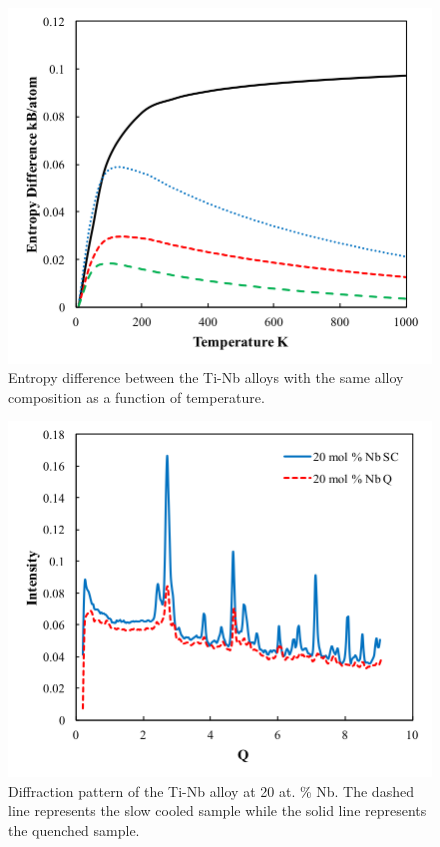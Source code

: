 \pagebreak
\begin{figure}[H]
	\centering
	\includegraphics[width=\textwidth]{Chapter-7/Figures/ediff.png}
	\caption{Entropy difference between the Ti-Nb alloys with the same alloy composition as a function of temperature.}
	\label{Ch7-figure:ediff}
\end{figure}

\pagebreak
\begin{figure}[H]
	\centering
	\includegraphics[width=\textwidth]{Chapter-7/Figures/50diff20.png}
	\caption{Diffraction pattern of the Ti-Nb alloy at 20 at. \% Nb. The dashed line represents the slow cooled sample while the solid line represents the quenched sample.}
	\label{Ch7-figure:50diff20}
\end{figure}

